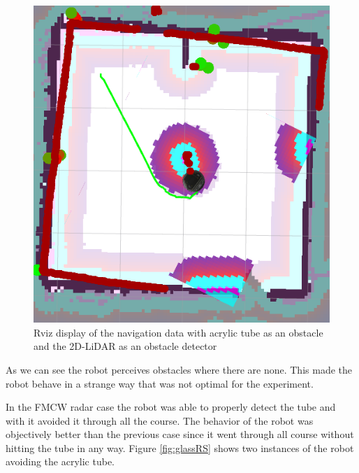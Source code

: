 \begin{figure}[ht!]
\centerline{\includegraphics [width=0.5 \textwidth]{imgs/chapter5/rvizglassscan.png}}
\caption{Rviz display of the navigation data with acrylic tube as an obstacle and the 2D-\ac{LiDAR} as an obstacle detector}
\label{fig:rvizglassradar}
\end{figure}
As we can see the robot perceives obstacles where there are none. This made the robot behave in a strange way that was not optimal for the experiment.


In the \ac{FMCW} \ac{radar} case the robot was able to properly detect the tube and with it avoided it through all the course. The behavior of the robot was objectively better than the previous case since it went through all course without hitting the tube in any way. Figure \ref{fig:glassRS} shows two instances of the robot avoiding the acrylic tube.

